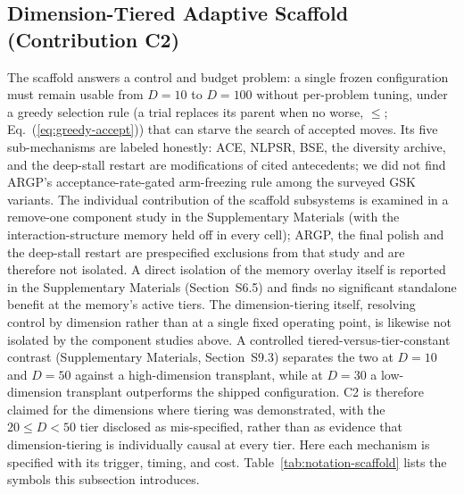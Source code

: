 \subsection{Dimension-Tiered Adaptive Scaffold (Contribution C2)}\label{sec:alg:scaffold}

The scaffold answers a control and budget problem: a single frozen
configuration must remain usable from $D=10$ to $D=100$ without
per-problem tuning, under a greedy selection rule (a trial replaces its
parent when no worse, $\le$; Eq.~(\ref{eq:greedy-accept})) that can
starve the search of accepted moves.
Its five sub-mechanisms are labeled honestly: ACE, NLPSR, BSE, the
diversity archive, and the deep-stall restart are modifications of cited
antecedents; we did not find ARGP's acceptance-rate-gated arm-freezing
rule among the surveyed GSK variants.
The individual contribution of the scaffold subsystems is examined in a
remove-one component study in the Supplementary Materials (with
the interaction-structure memory held off in every cell); ARGP, the final
polish and the deep-stall restart are prespecified exclusions from that study
and are therefore not isolated. A direct isolation
of the memory overlay itself is reported in the Supplementary Materials
(Section~S6.5) and finds no significant standalone benefit at the
memory's active tiers. The dimension-tiering itself, resolving control
by dimension rather than at a single fixed operating point, is likewise
not isolated by the component studies above. A controlled
tiered-versus-tier-constant contrast (Supplementary Materials,
Section~S9.3) separates the
two at $D = 10$ and $D = 50$ against a high-dimension transplant, while at
$D = 30$ a low-dimension transplant outperforms the shipped configuration. C2 is
therefore claimed for the dimensions where tiering was demonstrated, with the
$20 \leq D < 50$ tier disclosed as mis-specified, rather than as evidence that
dimension-tiering is individually causal at every tier.
Here each mechanism is specified with its trigger,
timing, and cost. Table~\ref{tab:notation-scaffold} lists the symbols this
subsection introduces.



